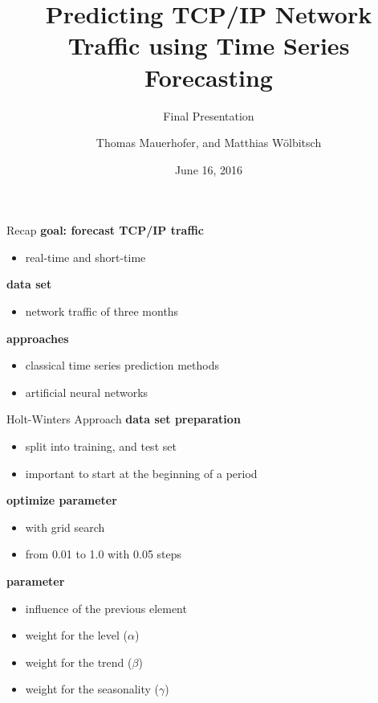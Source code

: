 \documentclass{beamer}
\title{Predicting TCP/IP Network Traffic using Time Series Forecasting}
\subtitle{Final Presentation}
\date{June 16, 2016}
\author{Thomas Mauerhofer, and Matthias Wölbitsch}
\begin{document}
  \maketitle
  
  \begin{frame}{Recap}   
    \textbf{goal: forecast TCP/IP traffic}
    \begin{itemize}
     \item real-time and short-time
    \end{itemize}
    
    \textbf{data set}
    \begin{itemize}
     \item network traffic of three months
    \end{itemize}
    
    \textbf{approaches}
    \begin{itemize}
     \item classical time series prediction methods
     \item artificial neural networks
    \end{itemize}
  \end{frame}
  
  \begin{frame}{Holt-Winters Approach}
    \textbf{data set preparation}
    \begin{itemize}
      \item split into training, and test set
      \item important to start at the beginning of a period
    \end{itemize}
    
    \textbf{optimize parameter}
    \begin{itemize}
     \item with grid search
     \item from 0.01 to 1.0 with 0.05 steps
    \end{itemize}
    
    \textbf{parameter}
    \begin{itemize}
      \item influence of the previous element
      \item weight for the level ($\alpha$)
      \item weight for the trend ($\beta$)
      \item weight for the seasonality ($\gamma$)
    \end{itemize}
  \end{frame}
  
\end{document}
